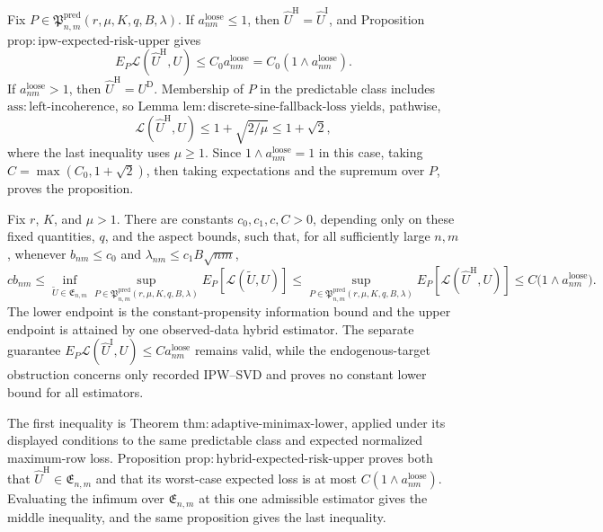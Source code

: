 Fix \(P\in\mathfrak P^{\mathrm{pred}}_{n,m}(r,\mu,K,q,B,\lambda)\).  If \(a^{\mathrm{loose}}_{nm}\le1\), then \(\widehat U^{\mathrm H}=\widehat U^{\mathrm I}\), and Proposition \(\mathrm{prop:ipw\mbox{-}expected\mbox{-}risk\mbox{-}upper}\) gives
\[
 E_P\mathcal L(\widehat U^{\mathrm H},U)
 \le C_0a^{\mathrm{loose}}_{nm}
 =C_0(1\wedge a^{\mathrm{loose}}_{nm}).
\]
If \(a^{\mathrm{loose}}_{nm}>1\), then \(\widehat U^{\mathrm H}=U^{\mathrm D}\).  Membership of \(P\) in the predictable class includes \(\mathrm{ass:left\mbox{-}incoherence}\), so Lemma \(\mathrm{lem:discrete\mbox{-}sine\mbox{-}fallback\mbox{-}loss}\) yields, pathwise,
\[
 \mathcal L(\widehat U^{\mathrm H},U)
 \le1+\sqrt{2/\mu}\le1+\sqrt2,
\]
where the last inequality uses \(\mu\ge1\).  Since \(1\wedge a^{\mathrm{loose}}_{nm}=1\) in this case, taking \(C=\max(C_0,1+\sqrt2)\), then taking expectations and the supremum over \(P\), proves the proposition.

Fix \(r\), \(K\), and \(\mu>1\).  There are constants \(c_0,c_1,c,C>0\), depending only on these fixed quantities, \(q\), and the aspect bounds, such that, for all sufficiently large \(n,m\), whenever \(b_{nm}\le c_0\) and \(\lambda_{nm}\le c_1B\sqrt{nm}\),
\[
 c b_{nm}\le
 \inf_{\widetilde U\in\mathfrak E_{n,m}}
 \sup_{P\in\mathfrak P^{\mathrm{pred}}_{n,m}(r,\mu,K,q,B,\lambda)}
 E_P[\mathcal L(\widetilde U,U)]
 \le
 \sup_{P\in\mathfrak P^{\mathrm{pred}}_{n,m}(r,\mu,K,q,B,\lambda)}
 E_P[\mathcal L(\widehat U^{\mathrm H},U)]
 \le C\bigl(1\wedge a^{\mathrm{loose}}_{nm}\bigr).
\]
The lower endpoint is the constant-propensity information bound and the upper endpoint is attained by one observed-data hybrid estimator.  The separate guarantee \(E_P\mathcal L(\widehat U^{\mathrm I},U)\le C a^{\mathrm{loose}}_{nm}\) remains valid, while the endogenous-target obstruction concerns only recorded IPW--SVD and proves no constant lower bound for all estimators.

The first inequality is Theorem \(\mathrm{thm:adaptive\mbox{-}minimax\mbox{-}lower}\), applied under its displayed conditions to the same predictable class and expected normalized maximum-row loss.  Proposition \(\mathrm{prop:hybrid\mbox{-}expected\mbox{-}risk\mbox{-}upper}\) proves both that \(\widehat U^{\mathrm H}\in\mathfrak E_{n,m}\) and that its worst-case expected loss is at most \(C(1\wedge a^{\mathrm{loose}}_{nm})\).  Evaluating the infimum over \(\mathfrak E_{n,m}\) at this one admissible estimator gives the middle inequality, and the same proposition gives the last inequality.

